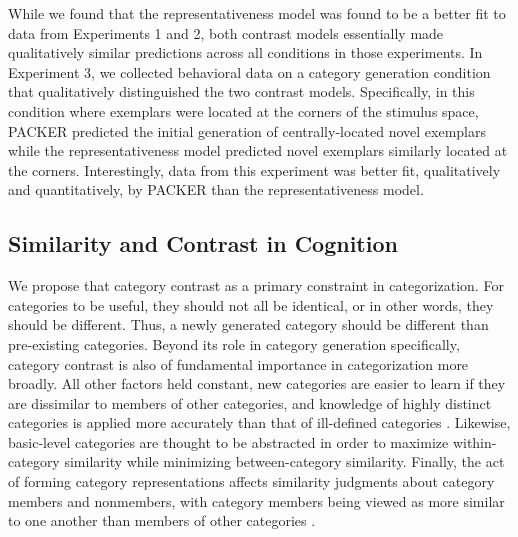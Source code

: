 \documentclass[12pt]{article}
\begin{document}
\begin{flushleft}
While we found that the representativeness model was found to be a better fit to
data from Experiments 1 and 2, both contrast models essentially made
qualitatively similar predictions across all conditions in those experiments. In
Experiment 3, we collected behavioral data on a category generation condition
that qualitatively distinguished the two contrast models. Specifically, in this
condition where exemplars were located at the corners of the stimulus space,
PACKER predicted the initial generation of centrally-located novel exemplars
while the representativeness model predicted novel exemplars similarly located
at the corners. Interestingly, data from this experiment was better fit,
qualitatively and quantitatively, by PACKER than the representativeness model.


\subsection{Similarity and Contrast in Cognition}
We propose that category contrast as a primary constraint in categorization. For categories to be useful, they should not all be identical, or in other words, they should be different. Thus, a newly generated category should be different than pre-existing categories. Beyond its role
in category generation specifically, category contrast is also of fundamental importance in
categorization more broadly. All other factors held constant, new categories are
easier to learn if they are dissimilar to members of other categories, and
knowledge of highly distinct categories is applied more accurately than that of
ill-defined categories \citep{ashby1994categorization,imai1965discriminability}.
Likewise, basic-level categories \citep{rosch1976basic} are thought to be
abstracted in order to maximize within-category similarity while minimizing
between-category similarity. Finally, the act of forming category
representations affects similarity judgments about category members and
nonmembers, with category members being viewed as more similar to one another
than members of other categories
\citep{goldstone1994influences,goldstone2001altering,goldstone1996isolated}.


\end{flushleft}
\end{document}
